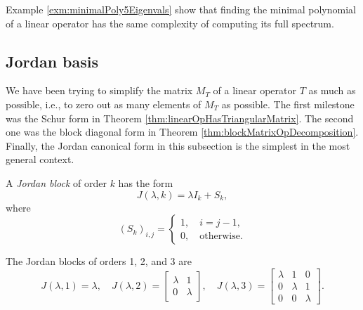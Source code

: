 \begin{rem}
  Example \ref{exm:minimalPoly5Eigenvals} show that
  finding the minimal polynomial
  of a linear operator has the same complexity
  of computing its full spectrum.
\end{rem}


\subsection{Jordan basis}
\label{sec:revi-jord-canon}

\begin{rem}
  We have been trying to simplify the matrix $M_T$ of a linear
  operator $T$
  as much as possible, i.e., 
  to zero out as many elements of $M_T$ as possible.
  The first milestone was the Schur form
  in Theorem \ref{thm:linearOpHasTriangularMatrix}.
  The second one was the block diagonal form
  in Theorem \ref{thm:blockMatrixOpDecomposition}.
  Finally, the Jordan canonical form in this subsection
  is the simplest in the most general context.
\end{rem}

\begin{defn}
  A \emph{Jordan block} of order $k$ has the form
  \begin{equation}
    \label{eq:JordanBlock}
    J(\lambda, k) = \lambda I_k+S_k,
  \end{equation}
  where
  \begin{equation*}
    (S_k)_{i,j}= \begin{cases}
      1, \quad i=j-1, \\
      0, \quad \text{otherwise.}
    \end{cases}
  \end{equation*}
\end{defn}

\begin{exm}
  The Jordan blocks of orders 1, 2, and 3 are
  \begin{equation*}
    J(\lambda, 1) = \lambda, \quad
    J(\lambda,2) = \begin{bmatrix}
      \lambda & 1 \\
      0 & \lambda
    \end{bmatrix}, \quad
    J(\lambda, 3) = \begin{bmatrix}
      \lambda & 1 & 0 \\
      0 & \lambda & 1 \\
      0 & 0 & \lambda
    \end{bmatrix}.
  \end{equation*}
\end{exm}

